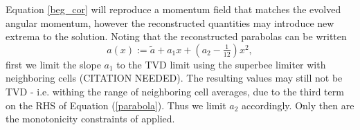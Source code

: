\documentclass{aastex63}
\begin{document}
Equation \ref{beg_cor} will reproduce a momentum field that matches the evolved angular momentum, however the reconstructed quantities may introduce new extrema to the solution. Noting that the 
reconstructed parabolas can be written
\begin{equation}
\label{parabola}
a\left(x\right) := \tilde{a} + a_1 x + \left(a_2 - \tfrac{1}{12}\right) x^2,
\end{equation}
first we limit the slope $a_1$ to the TVD limit using the superbee limiter with neighboring cells (CITATION NEEDED). The resulting values may still not be TVD - i.e. withing the range of neighboring cell averages, 
due to the third term on the RHS of Equation (\ref{parabola}). Thus we limit $a_2$ accordingly. Only then are the monotonicity constraints of \cite{COLELLA1984} applied.





\end{document}
